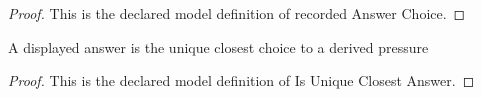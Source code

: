 \begin{proof}
  This is the declared model definition of recorded Answer Choice.
\end{proof}
\begin{definition}
  \label{def:physics:phyx-mini-0395:phyxminiproblems-problemphyxmini0395-isuniqueclosestanswer}
  A displayed answer is the unique closest choice to a derived pressure
\end{definition}
\begin{proof}
  This is the declared model definition of Is Unique Closest Answer.
\end{proof}
